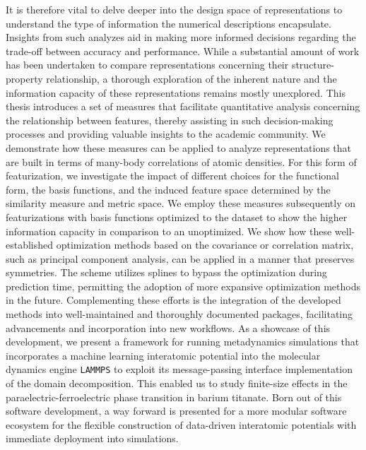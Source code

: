 It is therefore vital to delve deeper into the design space of representations to understand the type of information the numerical descriptions encapsulate.
Insights from such analyzes aid in making more informed decisions regarding the trade-off between accuracy and performance.
While a substantial amount of work has been undertaken to compare representations concerning their structure-property relationship, a thorough exploration of the inherent nature and the information capacity of these representations remains mostly unexplored.
This thesis introduces a set of measures that facilitate quantitative analysis concerning the relationship between features, thereby assisting in such decision-making processes and providing valuable insights to the academic community.
We demonstrate how these measures can be applied to analyze representations that are built in terms of many-body correlations of atomic densities.
For this form of featurization, we investigate the impact of different choices for the functional form, the basis functions, and the induced feature space determined by the similarity measure and metric space.
We employ these measures subsequently on featurizations with basis functions optimized to the dataset to show the higher information capacity in comparison to an unoptimized. 
We show how these well-established optimization methods based on the covariance or correlation matrix, such as principal component analysis, can be applied in a manner that preserves symmetries.
The scheme utilizes splines to bypass the optimization during prediction time, permitting the adoption of more expansive optimization methods in the future.
Complementing these efforts is the integration of the developed methods into well-maintained and thoroughly documented packages, facilitating advancements and incorporation into new workflows. %
As a showcase of this development, we present a framework for running metadynamics simulations that incorporates a machine learning interatomic potential into the molecular dynamics engine \texttt{LAMMPS} to exploit its message-passing interface implementation of the domain decomposition.
This enabled us to study finite-size effects in the paraelectric-ferroelectric phase transition in barium titanate.
Born out of this software development, a way forward is presented for a more modular software ecosystem for the flexible construction of data-driven interatomic potentials with immediate deployment into simulations.

